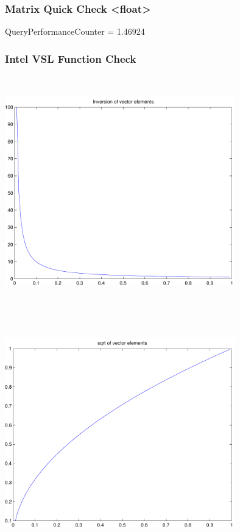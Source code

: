 \documentclass[9pt]{article}
\theoremstyle{plain}
\theoremstyle{definition}
\theoremstyle{remark}
\numberwithin{equation}{section}
\begin{document}
\subsubsection{Matrix Quick Check <float>}
QueryPerformanceCounter  =  1.46924
\subsubsection{Intel VSL Function Check}
\includegraphics[width=10.0cm,height=10.0cm]{klVSLInv.pdf}

\includegraphics[width=10.0cm,height=10.0cm]{klVSLSqrt.pdf}
\end{document}
